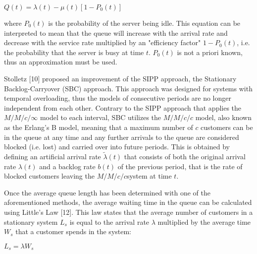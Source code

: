 $ Q(t) = \lambda(t) - \mu(t) [1 - P_0(t)] $

where $ P_0(t) $ is the probability of the server being idle. This equation can be interpreted to mean that the queue will increase with the arrival rate and decrease with the service rate multiplied by an "efficiency factor" $ 1 - P_0(t) $, i.e. the probability that the server is busy at time $ t $. $ P_0(t) $ is not a priori known, thus an approximation must be used.

Stolletz [10] proposed an improvement of the SIPP approach, the Stationary Backlog-Carryover (SBC) approach. This approach was designed for systems with temporal overloading, thus the models of consecutive periods are no longer independent from each other. Contrary to the SIPP approach that applies the $ M/M/c/\infty $ model to each interval, SBC utilizes the $ M/M/c/c $ model, also known as the Erlang’s B model, meaning that a maximum number of  $ c $ customers can be in the queue at any time and any further arrivals to the queue are considered blocked (i.e. lost) and carried over into future periods. This is obtained by defining an artificial arrival rate $ \widetilde{\lambda}(t) $ that consists of both the original arrival rate $ \lambda(t) $ and a backlog rate $ b(t) $ of the previous period, that is the rate of blocked customers leaving the $ M/M/c/c $system at time $ t $.

Once the average queue length has been determined with one of the aforementioned methods, the average waiting time in the queue can be calculated using Little’s Law [12]. This law states that the average number of customers in a stationary system $ L_s $ is equal to the arrival rate $ \lambda $ multiplied by the average time $ W_s $ that a customer spends in the system:

$ L_s = \lambda W_s $

\clearpage